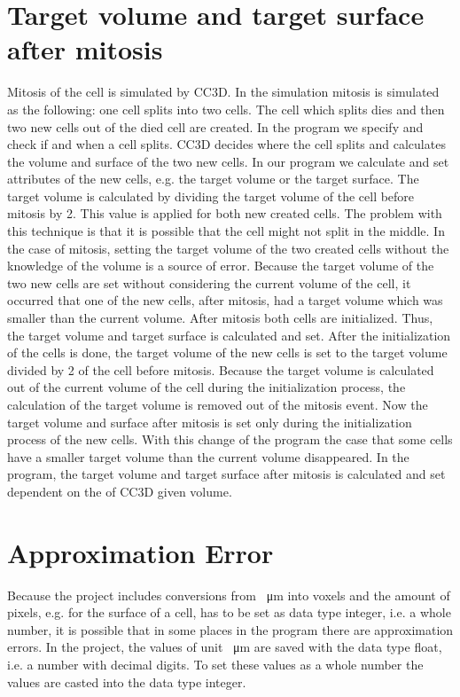 \section{Target volume and target surface after mitosis}
Mitosis of the cell is simulated by \ac{CC3D}. In the simulation mitosis is simulated as the following: one cell splits into two cells. The cell which splits dies and then two new cells out of the died cell are created. \newline
In the program we specify and check if and when a cell splits. \ac{CC3D} decides where the cell splits and calculates the volume and surface of the two new cells. In our program we calculate and set attributes of the new cells, e.g. the target volume or the target surface. \newline 
The target volume is calculated by dividing the target volume of the cell before mitosis by 2. This value is applied for both new created cells. The problem with this technique is that it is possible that the cell might not split in the middle. In the case of mitosis, setting the target volume of the two created cells without the knowledge of the volume is a source of error. Because the target volume of the two new cells are set without considering the current volume of the cell, it occurred that one of the new cells, after mitosis, had a target volume which was smaller than the current volume. \newline
After mitosis both cells are initialized. Thus, the target volume and target surface is calculated and set. After the initialization of the cells is done, the target volume of the new cells is set to the target volume divided by 2 of the cell before mitosis. \newline
Because the target volume is calculated out of the current volume of the cell during the initialization process, the calculation of the target volume is removed out of the mitosis event. Now the target volume and surface after mitosis is set only during the initialization process of the new cells. \newline
With this change of the program the case that some cells have a smaller target volume than the current volume disappeared. In the program, the target volume and target surface after mitosis is calculated and set dependent on the of \ac{CC3D} given volume.



\section{Approximation Error}
Because the project includes conversions from \SI{}{\micro\metre} into voxels and the amount of pixels, e.g. for the surface of a cell, has to be set as data type integer, i.e. a whole number, it is possible that in some places in the program there are approximation errors. In the project, the values of unit \SI{}{\micro\metre} are saved with the data type float, i.e. a number with decimal digits. To set these values as a whole number the values are casted into the data type integer. 


